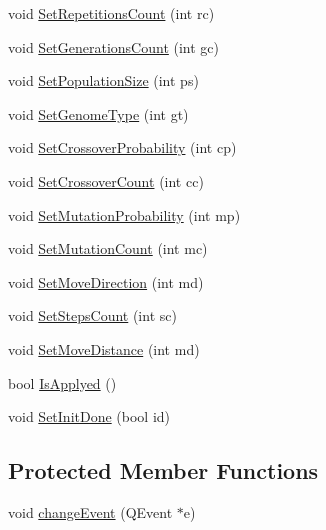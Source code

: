 \begin{DoxyCompactItemize}
void \hyperlink{classCWidgetEvolution_a3e5d42568af5ae95dd8d6c23ffa3d8a6}{SetRepetitionsCount} (int rc)
\item 
void \hyperlink{classCWidgetEvolution_ac37ef6a70355a7c15b3861a2e4112a96}{SetGenerationsCount} (int gc)
\item 
void \hyperlink{classCWidgetEvolution_a75cdaa493580c52f979f91c37f55e288}{SetPopulationSize} (int ps)
\item 
void \hyperlink{classCWidgetEvolution_ac81c258deaf2e7e58c197ec9e729fae1}{SetGenomeType} (int gt)
\item 
void \hyperlink{classCWidgetEvolution_a57c5a52ca97a082b05e9fa6738453a75}{SetCrossoverProbability} (int cp)
\item 
void \hyperlink{classCWidgetEvolution_ad4d552bfa2b441f1f0b8f78343a131e7}{SetCrossoverCount} (int cc)
\item 
void \hyperlink{classCWidgetEvolution_ab4f774d3c732bab25a981cf09690c279}{SetMutationProbability} (int mp)
\item 
void \hyperlink{classCWidgetEvolution_a568011dcfe6bdb00e24eca8b905dc486}{SetMutationCount} (int mc)
\item 
void \hyperlink{classCWidgetEvolution_a0d953499ba4929e231f649881e8324f9}{SetMoveDirection} (int md)
\item 
void \hyperlink{classCWidgetEvolution_a86ca9aaaa80695bb4c70347d971a76d5}{SetStepsCount} (int sc)
\item 
void \hyperlink{classCWidgetEvolution_a62380d2dc516f8c8da4448a2129f2de7}{SetMoveDistance} (int md)
\item 
bool \hyperlink{classCWidgetEvolution_a9d1d32df0aa44d939f778329d1c1408a}{IsApplyed} ()
\item 
void \hyperlink{classCWidgetEvolution_aeb3ae4928b09eed819d3c3e7562848ac}{SetInitDone} (bool id)
\end{DoxyCompactItemize}
\subsection*{Protected Member Functions}
\begin{DoxyCompactItemize}
\item 
void \hyperlink{classCWidgetEvolution_ac15f1ad2dbe291bfbc5ac6a815d03820}{changeEvent} (QEvent $\ast$e)
\end{DoxyCompactItemize}
